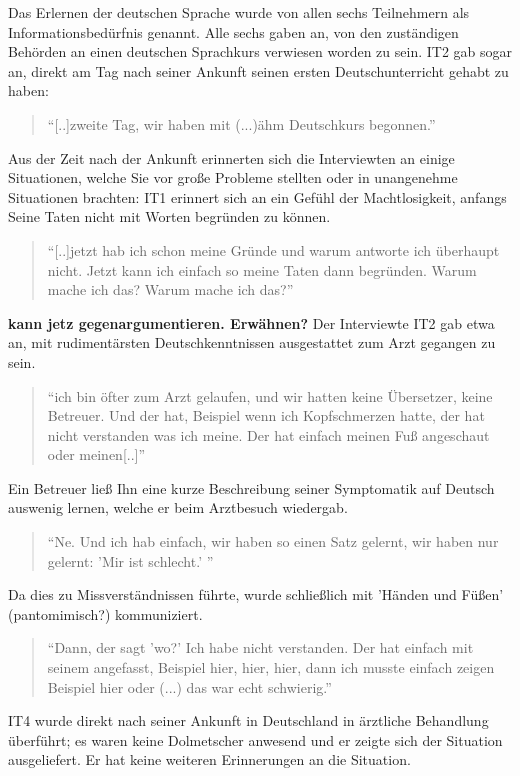  

Das Erlernen der deutschen Sprache wurde von allen sechs Teilnehmern als Informationsbedürfnis genannt. Alle sechs gaben an, von den zuständigen Behörden an einen deutschen Sprachkurs verwiesen worden zu sein. IT2 gab sogar an, direkt am Tag nach seiner Ankunft seinen ersten Deutschunterricht gehabt zu haben:
\begin{quote}
    ``[..]zweite Tag, wir haben mit (...)ähm Deutschkurs begonnen.''
\end{quote}
Aus der Zeit nach der Ankunft erinnerten sich die Interviewten an einige Situationen, welche Sie vor große Probleme stellten oder in unangenehme Situationen brachten:\newline
IT1 erinnert sich an ein Gefühl der Machtlosigkeit, anfangs Seine Taten nicht mit Worten begründen zu können.
\begin{quote}
    ``[..]jetzt hab ich schon meine Gründe und warum antworte ich überhaupt nicht. Jetzt kann ich einfach so meine Taten dann begründen. Warum mache ich das? Warum mache ich das?''
\end{quote}
\textbf{kann jetz gegenargumentieren. Erwähnen?}
Der Interviewte IT2 gab etwa an, mit rudimentärsten Deutschkenntnissen ausgestattet zum Arzt gegangen zu sein. 
\begin{quote}
    ``ich bin öfter zum Arzt gelaufen, und wir hatten keine Übersetzer, keine Betreuer. Und der hat, Beispiel wenn ich Kopfschmerzen hatte, der hat nicht verstanden was ich meine. Der hat einfach meinen Fuß angeschaut oder meinen[..]''
\end{quote}
Ein Betreuer ließ Ihn eine kurze Beschreibung seiner Symptomatik auf Deutsch auswenig lernen, welche er beim Arztbesuch wiedergab. 
\begin{quote}
    ``Ne. Und ich hab einfach, wir haben so einen Satz gelernt, wir haben nur gelernt: 'Mir ist schlecht.' ''
\end{quote}
Da dies zu Missverständnissen führte, wurde schließlich mit 'Händen und Füßen' (pantomimisch?) kommuniziert.\newline
\begin{quote}
    ``Dann, der sagt 'wo?' Ich habe nicht verstanden. Der hat einfach mit seinem angefasst, Beispiel hier, hier, hier, dann ich musste einfach zeigen Beispiel hier oder (...) das war echt schwierig.''
\end{quote}
IT4 wurde direkt nach seiner Ankunft in Deutschland in ärztliche Behandlung überführt; es waren keine Dolmetscher anwesend und er zeigte sich der Situation ausgeliefert. Er hat keine weiteren Erinnerungen an die Situation.
